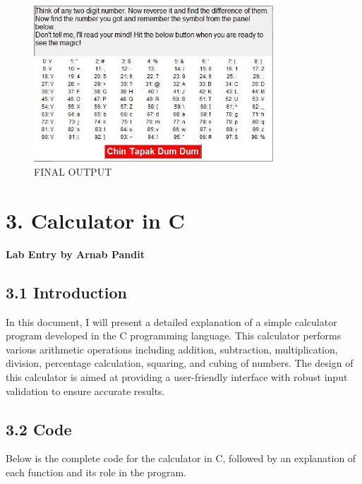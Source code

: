 \documentclass[a4paper,12pt]{article}
\begin{document}
\begin{figure}[h!]
    \centering
    \includegraphics[width=0.8\textwidth]{output.jpeg} %
    \caption{FINAL OUTPUT}
\end{figure}

\vspace{0.5cm}
\newpage

\section*{3. Calculator in C}
\textbf{Lab Entry by Arnab Pandit}

\subsection*{3.1 Introduction}
In this document, I will present a detailed explanation of a simple calculator program developed in the C programming language. This calculator performs various arithmetic operations including addition, subtraction, multiplication, division, percentage calculation, squaring, and cubing of numbers. The design of this calculator is aimed at providing a user-friendly interface with robust input validation to ensure accurate results.

\subsection*{3.2 Code}
Below is the complete code for the calculator in C, followed by an explanation of each function and its role in the program.
\end{document}
